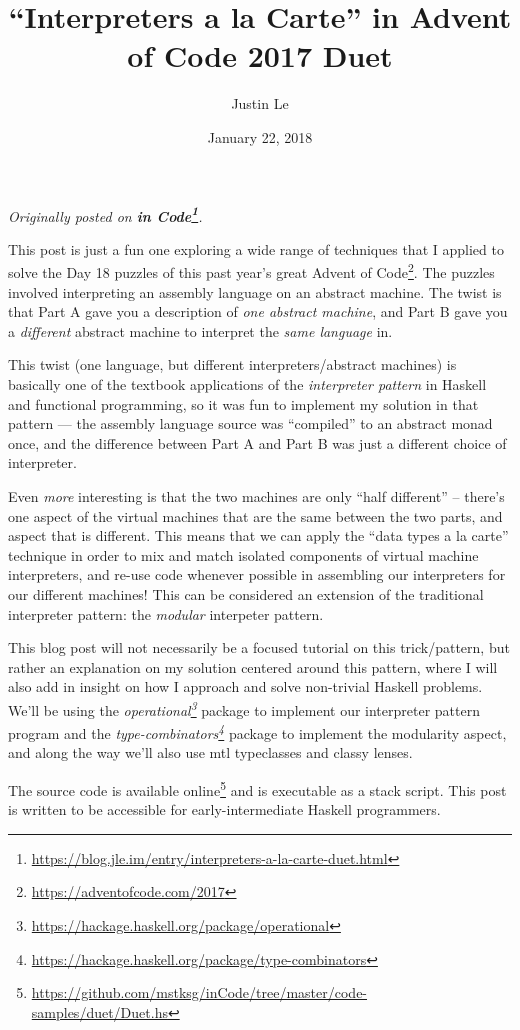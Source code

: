 \documentclass[]{article}
\title{``Interpreters a la Carte'' in Advent of Code 2017 Duet}
\author{Justin Le}
\date{January 22, 2018}
\renewcommand{\href}[2]{#2\footnote{\url{#1}}}
\begin{document}
\maketitle

\emph{Originally posted on
\textbf{\href{https://blog.jle.im/entry/interpreters-a-la-carte-duet.html}{in
Code}}.}

This post is just a fun one exploring a wide range of techniques that I applied
to solve the Day 18 puzzles of this past year's great
\href{https://adventofcode.com/2017}{Advent of Code}. The puzzles involved
interpreting an assembly language on an abstract machine. The twist is that Part
A gave you a description of \emph{one abstract machine}, and Part B gave you a
\emph{different} abstract machine to interpret the \emph{same language} in.

This twist (one language, but different interpreters/abstract machines) is
basically one of the textbook applications of the \emph{interpreter pattern} in
Haskell and functional programming, so it was fun to implement my solution in
that pattern --- the assembly language source was ``compiled'' to an abstract
monad once, and the difference between Part A and Part B was just a different
choice of interpreter.

Even \emph{more} interesting is that the two machines are only ``half
different'' -- there's one aspect of the virtual machines that are the same
between the two parts, and aspect that is different. This means that we can
apply the ``data types a la carte'' technique in order to mix and match isolated
components of virtual machine interpreters, and re-use code whenever possible in
assembling our interpreters for our different machines! This can be considered
an extension of the traditional interpreter pattern: the \emph{modular}
interpeter pattern.

This blog post will not necessarily be a focused tutorial on this trick/pattern,
but rather an explanation on my solution centered around this pattern, where I
will also add in insight on how I approach and solve non-trivial Haskell
problems. We'll be using the
\emph{\href{https://hackage.haskell.org/package/operational}{operational}}
package to implement our interpreter pattern program and the
\emph{\href{https://hackage.haskell.org/package/type-combinators}{type-combinators}}
package to implement the modularity aspect, and along the way we'll also use mtl
typeclasses and classy lenses.

The source code is
\href{https://github.com/mstksg/inCode/tree/master/code-samples/duet/Duet.hs}{available
online} and is executable as a stack script. This post is written to be
accessible for early-intermediate Haskell programmers.
\end{document}
